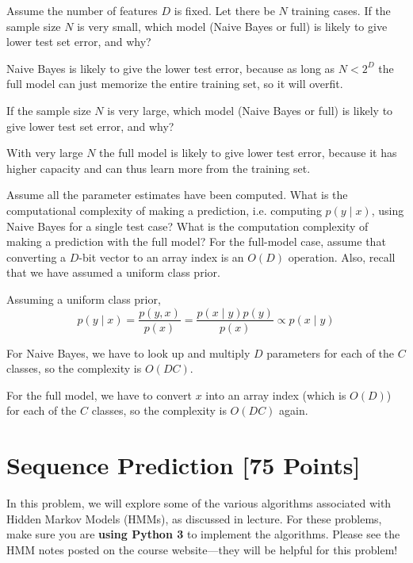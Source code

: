 \problem[2] Assume the number of features $D$ is fixed. Let there be $N$ training cases. If the sample size $N$ is very small, which model (Naive Bayes or full) is likely to give lower test set error, and why?

\begin{solution}
  Naive Bayes is likely to give the lower test error, because as long as $N < 2^D$ the full model can just memorize the entire training set, so it will overfit.
\end{solution}

\problem[2] If the sample size $N$ is very large, which model (Naive Bayes or full) is likely to give lower test set error, and why?
\begin{solution}
  With very large $N$ the full model is likely to give lower test error, because it has higher capacity and can thus learn more from the training set.
\end{solution}

\problem[11] Assume all the parameter estimates have been computed. What is the computational complexity of making a prediction, i.e. computing $p(y \mid x)$, using Naive Bayes for a single test case? What is the computation complexity of making a prediction with the full model? For the full-model case, assume that converting a $D$-bit vector to an array index is an $O(D)$ operation.  Also, recall that we have assumed a uniform class prior. 

\begin{solution}
  Assuming a uniform class prior,
  $$ p(y \mid x) = \frac{p(y, x)}{p(x)} = \frac{p(x \mid y) p(y)}{p(x)} \propto p(x \mid y) $$

  For Naive Bayes, we have to look up and multiply $D$ parameters for each of the $C$ classes, so the complexity is $O(DC)$.

  For the full model, we have to convert $x$ into an array index (which is $O(D)$) for each of the $C$ classes, so the complexity is $O(DC)$ again.
\end{solution}


\newpage
\section{Sequence Prediction [75 Points]}

In this problem, we will explore some of the various algorithms associated with Hidden Markov Models (HMMs), as discussed in lecture.  For these problems, make sure you are \textbf{using Python 3} to implement the algorithms. Please see the HMM notes posted on the course website---they will be helpful for this problem!


